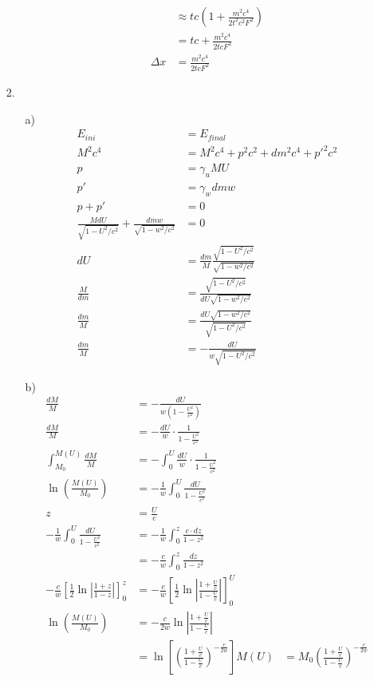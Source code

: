 \documentclass{article}
\begin{document}
\begin{itemize}
\begin{itemize}
\begin{align*}
            &\approx tc(1+\frac{m^2c^4}{2t^2c^2F^2})\\ 
            &=tc+\frac{m^2c^4}{2tcF^2}\\
            \Delta x &=\frac{m^2c^4}{2tcF^2}
        \end{align*}
    \end{itemize}
    \item [2.]
    \begin{itemize}
        \item [a)]
        \begin{align*}
            E_{ini}&=E_{final}\\
            M^2c^4 &=M^2c^4+p^2c^2+dm^2c^4+p'^2c^2\\
            p &=\gamma_u MU\\
            p' &= \gamma_w dm w\\
            p+p'&=0\\
            \frac{MdU}{\sqrt{1-U^2/c^2}}+\frac{dm w}{\sqrt{1-w^2/c^2}}&=0\\
            dU &=\frac{dm}{M} \frac{\sqrt{1-U^2/c^2}}{\sqrt{1-w^2/c^2}}\\
            \frac{M}{dm}&=\frac{\sqrt{1-U^2/c^2}}{dU \sqrt{1-w^2/c^2}}\\
            \frac{dm}{M}&=\frac{dU \sqrt{1-w^2/c^2}}{\sqrt{1-U^2/c^2}}\\
            \frac{dm}{M}&=-\frac{dU }{w\sqrt{1-U^2/c^2}}
        \end{align*}
        \item [b)]
        \begin{align*}
            \frac{dM}{M} &= -\frac{dU}{w\left(1 - \frac{U^2}{c^2}\right)}\\
            \frac{dM}{M} &= -\frac{dU}{w} \cdot \frac{1}{1 - \frac{U^2}{c^2}}\\
            \int_{M_0}^{M(U)} \frac{dM}{M} &= -\int_0^U \frac{dU}{w} \cdot \frac{1}{1 - \frac{U^2}{c^2}}\\
            \ln\left(\frac{M(U)}{M_0}\right) &= -\frac{1}{w} \int_0^U \frac{dU}{1 - \frac{U^2}{c^2}}\\
            z &= \frac{U}{c}\\
            -\frac{1}{w} \int_0^U \frac{dU}{1 - \frac{U^2}{c^2}} &= -\frac{1}{w} \int_0^z \frac{c \cdot dz}{1 - z^2} \\ &= -\frac{c}{w} \int_0^z \frac{dz}{1 - z^2}\\
            -\frac{c}{w} \left[\frac{1}{2} \ln\left|\frac{1 + z}{1 - z}\right|\right]_0^z &= -\frac{c}{w} \left[\frac{1}{2} \ln\left|\frac{1 + \frac{U}{c}}{1 - \frac{U}{c}}\right|\right]_0^U\\
            \ln\left(\frac{M(U)}{M_0}\right) &= -\frac{c}{2w} \ln\left|\frac{1 + \frac{U}{c}}{1 - \frac{U}{c}}\right|\\
            &=\ln\left[\left(\frac{1 + \frac{U}{c}}{1 - \frac{U}{c}}\right)^{-\frac{c}{2w}}\right]
            M(U) &= M_0 \left(\frac{1 + \frac{U}{c}}{1 - \frac{U}{c}}\right)^{-\frac{c}{2w}}
        \end{align*}
    \end{itemize}
\end{itemize}
\end{document}
